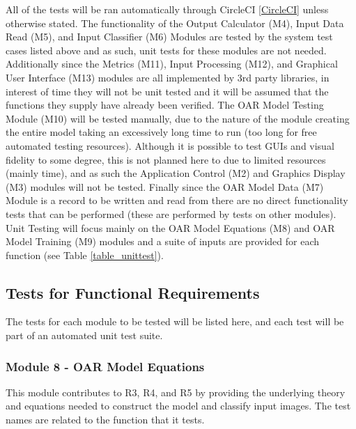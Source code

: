 \documentclass[12pt, titlepage]{article}
\begin{document}
All of the tests will be ran automatically through CircleCI \ref{CircleCI} unless otherwise stated.
The functionality of the Output Calculator (M4), Input Data Read (M5), and Input Classifier (M6) Modules are tested by the
system test cases listed above and as such, unit tests for these modules are not needed. Additionally since the Metrics (M11), Input Processing (M12),
and Graphical User Interface (M13) modules are all implemented by 3rd party libraries, in interest of time they will not be unit tested and it 
will be assumed that the functions they supply have already been verified. The OAR Model Testing Module (M10) will be tested manually, due to the nature of the
module creating the entire model taking an excessively long time to run (too long for free automated testing resources). Although it is possible to test GUIs and visual fidelity to some degree, this
is not planned here to due to limited resources (mainly time), and as such the Application Control (M2) and Graphics Display (M3) modules will not be tested.
Finally since the OAR Model Data (M7) Module is a record to be written and read from there are no direct functionality tests that can be performed 
(these are performed by tests on other modules). 
Unit Testing will focus mainly on the OAR Model Equations (M8) and OAR Model Training (M9) modules and a suite of inputs are provided for each function (see Table \ref{table_unittest}).

\subsection{Tests for Functional Requirements}

The tests for each module to be tested will be listed here, and each test will be part of an automated unit test suite.

\subsubsection{Module 8 - OAR Model Equations}
This module contributes to R3, R4, and R5 by providing the underlying theory and equations needed to construct the model and classify input images.
The test names are related to the function that it tests.
\end{document}
